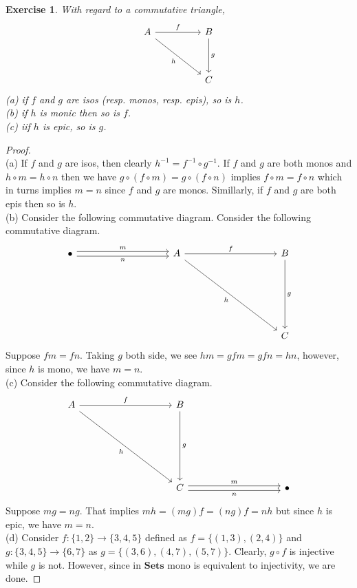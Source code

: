 \documentclass[a4paper, 11pt]{book}
\theoremstyle{plain}
\newtheorem{exercise}{Exercise}[chapter]
\theoremstyle{plain}
\newcommand{\mb}{\mathbf}
\newcommand{\arr}{\rightarrow}
\newcommand{\inv}{{-1}}
\begin{document}
  \begin{exercise}
    With regard to a commutative triangle, 
    \[\begin{tikzcd}
      A && B \\
      \\
      && C
      \arrow["f", from=1-1, to=1-3]
      \arrow["g", from=1-3, to=3-3]
      \arrow["h"', from=1-1, to=3-3]
    \end{tikzcd}\]
    (a) if $f$ and $g$ are isos (resp. monos, resp. epis), so is $h$. \\
    (b) if $h$ is monic then so is $f$. \\
    (c) iif $h$ is epic, so is $g$.
  \end{exercise}
  \begin{proof} $ $ \\
    (a) If $f$ and $g$ are isos, then clearly $h^{-1}=f^\inv \circ g^\inv$. If $f$ and $g$ are both monos and $h \circ m = h \circ n$ then we have $g \circ (f \circ m)=g \circ (f \circ n)$ implies $f \circ m = f \circ n$ which in turns implies $m=n$ since $f$ and $g$ are monos. Simillarly, if $f$ and $g$ are both epis then so is $h$. \\

    (b) Consider the following commutative diagram. 
    Consider the following commutative diagram. 
    \[\begin{tikzcd}
      \bullet &&&& A &&&& B \\
      \\
      \\
      \\
      &&&&&&&& C
      \arrow["f", from=1-5, to=1-9]
      \arrow["g", from=1-9, to=5-9]
      \arrow["h"', from=1-5, to=5-9]
      \arrow["m", shift left=1, from=1-1, to=1-5]
      \arrow["n"', shift right=1, from=1-1, to=1-5]
    \end{tikzcd}\]
      Suppose $fm=fn$. Taking $g$ both side, we see $hm=gfm=gfn=hn$, however, since $h$ is mono, we have $m=n$. \\
      
    (c) Consider the following commutative diagram.
    \[\begin{tikzcd}
      A &&&& B \\
      \\
      \\
      \\
      &&&& C &&&& \bullet
      \arrow["f", from=1-1, to=1-5]
      \arrow["g", from=1-5, to=5-5]
      \arrow["h"', from=1-1, to=5-5]
      \arrow["m", shift left=1, from=5-5, to=5-9]
      \arrow["n"', shift right=1, from=5-5, to=5-9]
    \end{tikzcd}\]
    Suppose $mg=ng$. That implies $mh=(mg)f=(ng)f=nh$ but since $h$ is epic, we have $m=n$. \\
    
    (d) Consider $f: \{1,2\} \arr \{3,4,5\}$ defined as $f=\{(1,3), (2,4)\}$ and $g: \{3,4,5\} \arr \{6,7\}$ as $g=\{(3,6), (4,7), (5,7)\}$. Clearly, $g \circ f$ is injective while $g$ is not. However, since in $\mb{Sets}$ mono is equivalent to injectivity, we are done.
  \end{proof}
\end{document}
